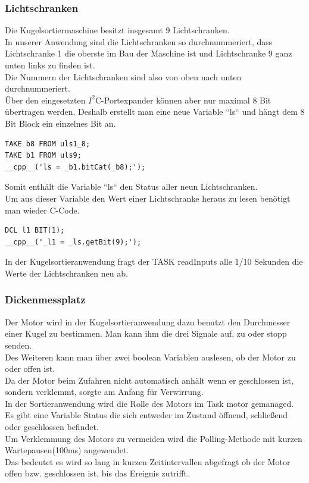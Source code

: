 \subsubsection{Lichtschranken}
Die Kugelsortiermaschine besitzt insgesamt 9 Lichtschranken.\\
In unserer Anwendung sind die Lichtschranken so durchnummeriert, dass Lichtschranke 1 die oberste im Bau der Maschine ist und Lichtschranke 9 ganz unten links zu finden ist.\\
Die Nummern der Lichtschranken sind also von oben nach unten durchnummeriert.\\
Über den eingesetzten $I^2$C-Portexpander können aber nur maximal 8 Bit übertragen werden.
Deshalb erstellt man eine neue Variable “ls“ und hängt dem 8 Bit Block ein einzelnes Bit an.\\
\begin{lstlisting}
TAKE b8 FROM uls1_8;
TAKE b1 FROM uls9;
__cpp__('ls = _b1.bitCat(_b8);');
\end{lstlisting}
Somit enthält die Variable “ls“ den Status aller neun Lichtschranken.\\
Um aus dieser Variable den Wert einer Lichtschranke heraus zu lesen benötigt man wieder C-Code.\\
\begin{lstlisting}
DCL l1 BIT(1);
__cpp__('_l1 = _ls.getBit(9);');
\end{lstlisting}
In der Kugelsortieranwendung fragt der TASK readInputs alle 1/10 Sekunden die Werte der Lichtschranken neu ab.\\
\clearpage
\subsubsection{Dickenmessplatz}
Der Motor wird in der Kugelsortieranwendung dazu benutzt den Durchmesser einer Kugel zu bestimmen. Man kann ihm die drei Signale auf, zu oder stopp senden.\\
Des Weiteren kann man über zwei boolean Variablen auslesen, ob der Motor zu oder offen ist.\\
Da der Motor beim Zufahren nicht automatisch anhält wenn er geschlossen ist, sondern verklemmt, sorgte am Anfang für Verwirrung.\\
In der Sortieranwendung wird die Rolle des Motors im Task motor gemanaged.\\
Es gibt eine Variable Status die sich entweder im Zustand öffnend, schließend oder geschlossen befindet.\\
Um Verklemmung des Motors zu vermeiden wird die Polling-Methode mit kurzen Wartepausen(100ms) angewendet.\\
Das bedeutet es wird so lang in kurzen Zeitintervallen abgefragt ob der Motor offen bzw. geschlossen ist, bis das Ereignis zutrifft.\\
\newpage

